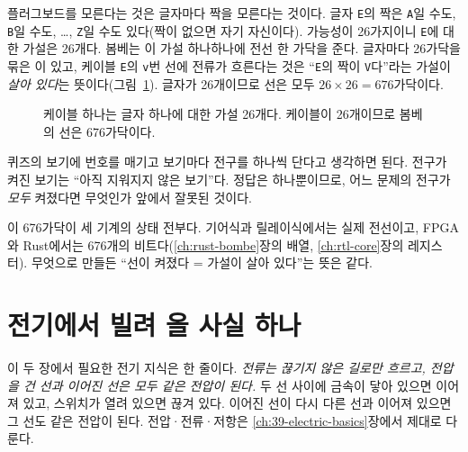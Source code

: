 \Why 플러그보드를 모른다는 것은 글자마다 짝을 모른다는 것이다. 글자 \texttt{E}의 짝은 \texttt{A}일 수도,
\texttt{B}일 수도, \ldots, \texttt{Z}일 수도 있다(짝이 없으면 자기 자신이다). 가능성이 26가지이니 \texttt{E}에
대한 가설은 26개다. 봄베는 이 가설 하나하나에 전선 한 가닥을 준다. 글자마다 26가닥을 묶은
이 있고, 케이블 \texttt{E}의 \texttt{v}번 선에 전류가 흐른다는 것은 ``\texttt{E}의 짝이
\texttt{V}다''라는 가설이 \emph{살아 있다}는 뜻이다(그림~\ref{fig:c-cable}). 글자가 26개이므로 선은 모두
$26 \times 26 = 676$가닥이다.

\begin{figure}[ht]
\centering
{}
\caption{케이블 하나는 글자 하나에 대한 가설 26개다. 케이블이 26개이므로 봄베의 선은 676가닥이다.}
\label{fig:c-cable}
\end{figure}

\General 퀴즈의 보기에 번호를 매기고 보기마다 전구를 하나씩 단다고 생각하면 된다. 전구가 켜진 보기는 ``아직
지워지지 않은 보기''다. 정답은 하나뿐이므로, 어느 문제의 전구가 \emph{모두} 켜졌다면 무엇인가 앞에서 잘못된
것이다.

\Ours 이 676가닥이 세 기계의 상태 전부다. 기어식과 릴레이식에서는 실제 전선이고, FPGA와 Rust에서는 676개의
비트다(\ref{ch:rust-bombe}장의  배열, \ref{ch:rtl-core}장의  레지스터). 무엇으로
만들든 ``선이 켜졌다 = 가설이 살아 있다''는 뜻은 같다.

\section{전기에서 빌려 올 사실 하나}\label{sec:c-current}

이 두 장에서 필요한 전기 지식은 한 줄이다. \emph{전류는 끊기지 않은 길로만 흐르고, 전압을 건 선과 이어진
선은 모두 같은 전압이 된다.} 두 선 사이에 금속이 닿아 있으면 이어져 있고, 스위치가 열려 있으면 끊겨 있다.
이어진 선이 다시 다른 선과 이어져 있으면 그 선도 같은 전압이 된다. 전압·전류·저항은 \ref{ch:39-electric-basics}장에서
제대로 다룬다.

